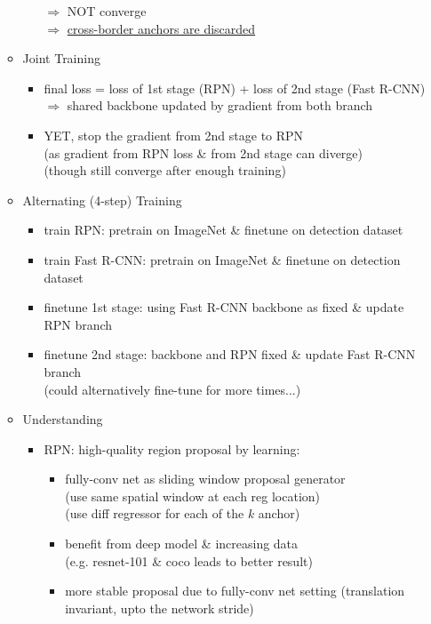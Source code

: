 \begin{itemize}
\begin{itemize}
\begin{itemize}
		$\Rightarrow$ NOT converge \\ 
		$\Rightarrow$ \underline{cross-border anchors are discarded}
		\end{itemize}
	\item Joint Training
		\begin{itemize}
		\item final loss = loss of 1st stage (RPN) + loss of 2nd stage (Fast R-CNN) \\
		$\Rightarrow$ shared backbone updated by gradient from both branch
		\item YET, stop the gradient from 2nd stage to RPN \\
		(as gradient from RPN loss \& from 2nd stage can diverge) \\
		(though still converge after enough training)
		\end{itemize}
	\item Alternating (4-step) Training
		\begin{itemize}
		\item train RPN: pretrain on ImageNet \& finetune on detection dataset
		\item train Fast R-CNN: pretrain on ImageNet \& finetune on detection dataset
		\item finetune 1st stage: using Fast R-CNN backbone as fixed \& update RPN branch
		\item finetune 2nd stage: backbone and RPN fixed \& update Fast R-CNN branch \\
		(could alternatively fine-tune for more times...)
		\end{itemize}
	\item Understanding
		\begin{itemize}
		\item RPN: high-quality region proposal by learning:
			\begin{itemize}
			\item fully-conv net as sliding window proposal generator \\
			(use same spatial window at each reg location) \\
			(use diff regressor for each of the $k$ anchor)
			\item benefit from deep model \& increasing data \\
			(e.g. resnet-101 \& coco leads to better result)
			\item more stable proposal due to fully-conv net setting
			(translation invariant, upto the network stride)
			\end{itemize}

\end{itemize}
\end{itemize}
\end{itemize}
